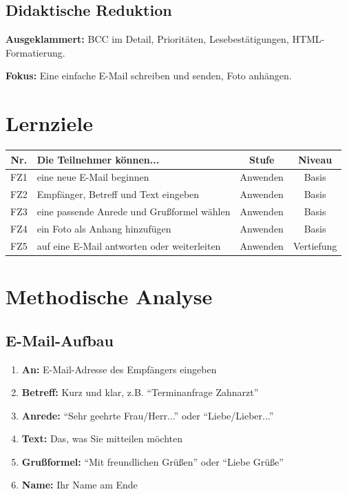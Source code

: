 \documentclass[11pt,a4paper]{article}
\begin{document}
\subsection{Didaktische Reduktion}
\textbf{Ausgeklammert:} BCC im Detail, Prioritäten, Lesebestätigungen, HTML-Formatierung.

\textbf{Fokus:} Eine einfache E-Mail schreiben und senden, Foto anhängen.

\section{Lernziele}

\begin{tabular}{|c|p{7cm}|c|c|}
\hline
\textbf{Nr.} & \textbf{Die Teilnehmer können...} & \textbf{Stufe} & \textbf{Niveau} \\
\hline
FZ1 & eine neue E-Mail beginnen & Anwenden & Basis \\
FZ2 & Empfänger, Betreff und Text eingeben & Anwenden & Basis \\
FZ3 & eine passende Anrede und Grußformel wählen & Anwenden & Basis \\
FZ4 & ein Foto als Anhang hinzufügen & Anwenden & Basis \\
FZ5 & auf eine E-Mail antworten oder weiterleiten & Anwenden & Vertiefung \\
\hline
\end{tabular}

\section{Methodische Analyse}

\subsection{E-Mail-Aufbau}
\begin{tippbox}
\begin{enumerate}
    \item \textbf{An:} E-Mail-Adresse des Empfängers eingeben
    \item \textbf{Betreff:} Kurz und klar, z.B. ``Terminanfrage Zahnarzt''
    \item \textbf{Anrede:} ``Sehr geehrte Frau/Herr...'' oder ``Liebe/Lieber...''
    \item \textbf{Text:} Das, was Sie mitteilen möchten
    \item \textbf{Grußformel:} ``Mit freundlichen Grüßen'' oder ``Liebe Grüße''
    \item \textbf{Name:} Ihr Name am Ende
\end{enumerate}
\end{tippbox}
\end{document}
